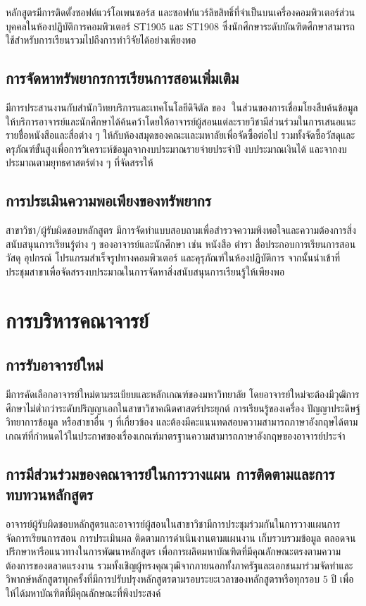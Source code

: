 \par\medskip

หลักสูตรมีการติดตั้งซอฟต์แวร์โอเพนซอร์ส และซอฟท์แวร์ลิขสิทธิ์ที่จำเป็นบนเครื่องคอมพิวเตอร์ส่วนบุคคลในห้องปฏิบัติการคอมพิวเตอร์ ST1905 และ ST1908 ซึ่งนักศึกษาระดับบัณฑิตศึกษาสามารถใช้สำหรับการเรียนรวมไปถึงการทำวิจัยได้อย่างเพียงพอ
\subsection{การจัดหาทรัพยากรการเรียนการสอนเพิ่มเติม}
\faculty{}มีการประสานงานกับสำนักวิทยบริการและเทคโนโลยีดิจิตัล ของ\university \,\, ในส่วนของการเชื่อมโยงสืบค้นข้อมูล ให้บริการอาจารย์และนักศึกษาได้ค้นคว้าโดยให้อาจารย์ผู้สอนแต่ละรายวิชามีส่วนร่วมในการเสนอแนะรายชื่ิอหนังสือและสื่อต่าง ๆ ให้กับห้องสมุดของคณะและมหาลัยเพื่อจัดซื้อต่อไป รวมทั้งจัดซื้อวัสดุและครุภัณฑ์ขั้นสูงเพื่อการวิเคราะห์ข้อมูลจากงบประมาณรายจ่ายประจำปี งบประมาณเงินได้ และจากงบประมาณตามยุทธศาสตร์ต่าง ๆ ที่\university จัดสรรให้

\subsection{การประเมินความพอเพียงของทรัพยากร}
สาขาวิชา/ผู้รับผิดชอบหลักสูตร มีการจัดทำแบบสอบถามเพื่อสำรวจความพึงพอใจและความต้องการสิ่งสนับสนุนการเรียนรู้ต่าง ๆ ของอาจารย์และนักศึกษา เช่น หนังสือ ตำรา สื่อประกอบการเรียนการสอน วัสดุ อุปกรณ์ โปรแกรมสำเร็จรูปทางคอมพิวเตอร์ และคุรุภัณฑ์ในห้องปฏิบัติการ จากนั้นนำเข้าที่ประชุมสาขา\thdegreebranch เพื่อจัดสรรงบประมาณในการจัดหาสิ่งสนับสนุนการเรียนรู้ให้เพียงพอ


\section{การบริหารคณาจารย์}
\subsection{การรับอาจารย์ใหม่}
มีการคัดเลือกอาจารย์ใหม่ตามระเบียบและหลักเกณฑ์ของมหาวิทยาลัย โดยอาจารย์ใหม่จะต้องมีวุฒิการศึกษาไม่ต่ำกว่าระดับปริญญาเอกในสาขาวิชาคณิตศาสตร์ประยุกต์ การเรียนรู้ของเครื่อง ปัญญาประดิษฐ์ วิทยาการข้อมูล หรือสาขาอื่น ๆ ที่เกี่ยวข้อง และต้องมีคะแนนทดสอบความสามารถภาษาอังกฤษได้ตามเกณฑ์ที่กำหนดไว้ในประกาศของ\university เรื่องเกณฑ์มาตรฐานความสามารถภาษาอังกฤษของอาจารย์ประจำ

 \subsection{การมีส่วนร่วมของคณาจารย์ในการวางแผน การติดตามและการทบทวนหลักสูตร}
อาจารย์ผู้รับผิดชอบหลักสูตรและอาจารย์ผู้สอนในสาขาวิชามีการประชุมร่วมกันในการวางแผนการจัดการเรียนการสอน การประเมินผล ติดตามการดำเนินงานตามแผนงาน เก็บรวบรวมข้อมูล ตลอดจนปรึกษาหารือแนวทางในการพัฒนาหลักสูตร เพื่อการผลิตมหาบัณฑิตที่มีคุณลักษณะตรงตามความต้องการของตลาดแรงงาน รวมทั้งเชิญผู้ทรงคุณวุฒิจากภายนอกทั้งภาครัฐและเอกชนมาร่วมจัดทำและวิพากษ์หลักสูตรทุกครั้งที่มีการปรับปรุงหลักสูตรตามรอบระยะเวลาของหลักสูตรหรือทุกรอบ 5 ปี เพื่อให้ได้มหาบัณฑิตที่มีคุณลักษณะที่พึงประสงค์

